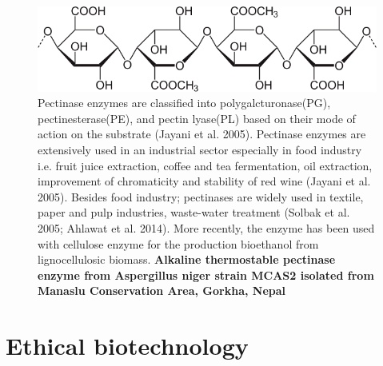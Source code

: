 \documentclass[
  ignorenonframetext,
  aspectratio=169]{beamer}
\begin{document}
\begin{frame}{}
\protect\hypertarget{section-5}{}
\begin{figure}
\includegraphics[width=0.65\linewidth]{../images/pectin-chemical-structure} \caption{Pectinase enzymes are classified into polygalcturonase(PG), pectinesterase(PE), and pectin lyase(PL) based on their mode of action on the substrate (Jayani et al. 2005). Pectinase enzymes are extensively used in an industrial sector especially in food industry i.e. fruit juice extraction, coffee and tea fermentation, oil extraction, improvement of chromaticity and stability of red wine (Jayani et al. 2005). Besides food industry; pectinases are widely used in textile, paper and pulp industries, waste-water treatment (Solbak et al. 2005; Ahlawat et al. 2014). More recently, the enzyme has been used with cellulose enzyme for the production bioethanol from lignocellulosic biomass. \textbf{Alkaline thermostable pectinase enzyme from Aspergillus niger strain MCAS2 isolated from Manaslu Conservation Area, Gorkha, Nepal}}\label{fig:pectinase-isolation-nepal}
\end{figure}
\end{frame}

\hypertarget{ethical-biotechnology}{%
\section{Ethical biotechnology}\label{ethical-biotechnology}}
\end{document}
